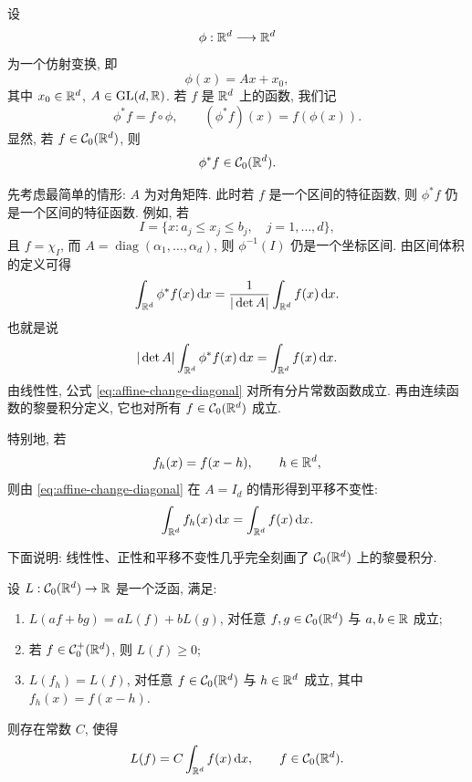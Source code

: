 设
\[
\phi:\mathbb{R}^d\longrightarrow \mathbb{R}^d
\]
为一个仿射变换, 即
\[
\phi(x)=Ax+x_0,
\label{eq:affine-map}
\]
其中 \(x_0\in\mathbb{R}^d\), \(A\in \operatorname{GL}(d,\mathbb{R})\). 若 \(f\) 是 \(\mathbb{R}^d\) 上的函数, 我们记
\[
\phi^*f=f\circ\phi,
\qquad
(\phi^*f)(x)=f(\phi(x)).
\]
显然, 若 \(f\in\mathcal{C}_0(\mathbb{R}^d)\), 则
\[
\phi^*f\in\mathcal{C}_0(\mathbb{R}^d).
\]

先考虑最简单的情形: \(A\) 为对角矩阵. 此时若 \(f\) 是一个区间的特征函数, 则 \(\phi^*f\) 仍是一个区间的特征函数. 例如, 若
\[
I=\{x:a_j\leq x_j\leq b_j,
\quad j=1,\ldots,d\},
\]
且 \(f=\chi_I\), 而 \(A=\operatorname{diag}(\alpha_1,\ldots,\alpha_d)\), 则 \(\phi^{-1}(I)\) 仍是一个坐标区间. 由区间体积的定义可得
\[
\int_{\mathbb{R}^d}\phi^*f(x)\,\dd x
=\frac{1}{|\det A|}\int_{\mathbb{R}^d}f(x)\,\dd x.
\]
也就是说
\begin{equation}
	|\det A|\int_{\mathbb{R}^d}\phi^*f(x)\,\dd x
	=
	\int_{\mathbb{R}^d}f(x)\,\dd x.
	\label{eq:affine-change-diagonal}
\end{equation}
由线性性, 公式 \eqref{eq:affine-change-diagonal} 对所有分片常数函数成立. 再由连续函数的黎曼积分定义, 它也对所有 \(f\in\mathcal{C}_0(\mathbb{R}^d)\) 成立.

特别地, 若
\[
f_h(x)=f(x-h),
\qquad h\in\mathbb{R}^d,
\]
则由 \eqref{eq:affine-change-diagonal} 在 \(A=I_d\) 的情形得到平移不变性:
\begin{equation}
	\int_{\mathbb{R}^d}f_h(x)\,\dd x
	=
	\int_{\mathbb{R}^d}f(x)\,\dd x.
	\label{eq:translation-invariance-riemann}
\end{equation}

下面说明: 线性性、正性和平移不变性几乎完全刻画了 \(\mathcal{C}_0(\mathbb{R}^d)\) 上的黎曼积分.

\begin{thm}\label{thm:translation-invariant-positive-functional}
	设 \(L:\mathcal{C}_0(\mathbb{R}^d)\to\mathbb{R}\) 是一个泛函, 满足:
	\begin{enumerate}
		\item \(L(af+bg)=aL(f)+bL(g)\), 对任意 \(f,g\in\mathcal{C}_0(\mathbb{R}^d)\) 与 \(a,b\in\mathbb{R}\) 成立;
		\item 若 \(f\in\mathcal{C}_0^+(\mathbb{R}^d)\), 则 \(L(f)\geq 0\);
		\item \(L(f_h)=L(f)\), 对任意 \(f\in\mathcal{C}_0(\mathbb{R}^d)\) 与 \(h\in\mathbb{R}^d\) 成立, 其中 \(f_h(x)=f(x-h)\).
	\end{enumerate}
	则存在常数 \(C\), 使得
	\[
	L(f)=C\int_{\mathbb{R}^d}f(x)\,\dd x,
	\qquad f\in\mathcal{C}_0(\mathbb{R}^d).
	\]
\end{thm}

